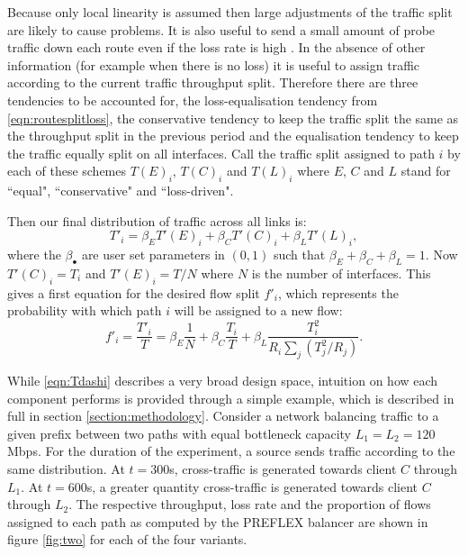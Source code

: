 Because only local linearity is assumed then large adjustments of the traffic split are likely to cause problems.  
It is also useful to send a small amount of probe traffic down each route even if the loss rate is high \cite{Kelly:2005p140}. 
In the absence of other information (for example when there is no loss) it is useful to assign traffic according to the current traffic throughput split.  Therefore there are three tendencies to be accounted for, the loss-equalisation tendency from \eqref{eqn:routesplitloss}, the conservative tendency to keep the traffic split the same as the throughput split in the previous period and the equalisation tendency to keep the traffic equally split on all interfaces.  
Call the traffic split assigned to path $i$  by each of these schemes $T(E)_i$, $T(C)_i$ and $T(L)_i$ where $E$, $C$ and $L$ stand for ``equal", ``conservative" and ``loss-driven".

Then our final distribution of traffic across all links is:
$$
T'_i = \beta_E T'(E)_i + \beta_C T'(C)_i + \beta_L T'(L)_i,
$$
where the $\beta_\bullet$ are user set parameters in $(0,1)$ such that $\beta_E+\beta_C + \beta_L = 1$.  Now $T'(C)_i = T_i$ and $T'(E)_i = T/N$ where $N$ is the number of interfaces. 
This gives a first equation for the desired flow split $f'_i$, which represents the probability with which path $i$ will be assigned to a new flow:
\begin{equation}
f'_i = \frac{T'_i}{T} =  \beta_E \frac{1}{N} + \beta_C \frac{T_i}{T} +
\beta_L \frac{T_i^2}{R_i \sum_j (T_j^2/R_j)}.
\label{eqn:Tdashi}
\end{equation}


While \eqref{eqn:Tdashi} describes a very broad design space, intuition on how each component performs is provided through a simple example, which is described in full in section \ref{section:methodology}. 
Consider a network balancing traffic to a given prefix between two paths with equal bottleneck capacity $L_1=L_2=120$Mbps.
For the duration of the experiment, a source sends traffic according to the same distribution.
At $t=300$s, cross-traffic is generated towards client $C$ through $L_1$.
At $t=600$s, a greater quantity cross-traffic is generated towards client $C$ through $L_2$.
The respective throughput, loss rate and the proportion of flows assigned to each path as computed by the \ac{PREFLEX} balancer are shown in figure \ref{fig:two} for each of the four variants.

